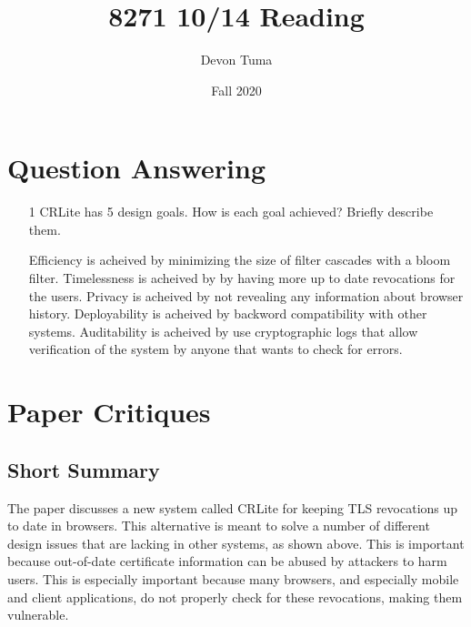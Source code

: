 \documentclass[11pt]{article}
\title{8271 10/14 Reading}
\author{Devon Tuma}
\date{Fall 2020}
\begin{document}
\maketitle

\section*{Question Answering}

\begin{itemize}
\item [1] CRLite has 5 design goals. How is each goal achieved? Briefly describe them.

  Efficiency is acheived by minimizing the size of filter cascades with a bloom filter.
  Timelessness is acheived by by having more up to date revocations for the users.
  Privacy is acheived by not revealing any information about browser history.
  Deployability is acheived by backword compatibility with other systems.
  Auditability is acheived by use cryptographic logs that allow verification of the system by anyone that wants to check for errors.
\end{itemize}

\section*{Paper Critiques}

\subsection*{Short Summary}

The paper discusses a new system called CRLite for keeping TLS revocations up to date in browsers.
This alternative is meant to solve a number of different design issues that are lacking in other systems, as shown above.
This is important because out-of-date certificate information can be abused by attackers to harm users.
This is especially important because many browsers, and especially mobile and client applications, do not properly check for these revocations, making them vulnerable.
\end{document}

